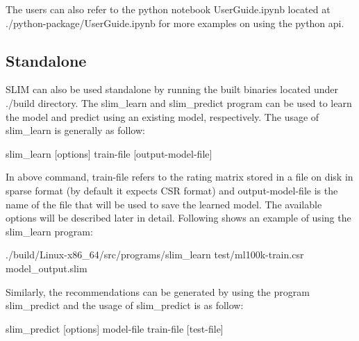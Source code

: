 The users can also refer to the python notebook {\ttfamily User\+Guide.\+ipynb} located at {\ttfamily ./python-\/package/\+User\+Guide.ipynb} for more examples on using the python api.\hypertarget{index_standalone_getting_Started}{}\subsection{Standalone}\label{index_standalone_getting_Started}
S\+L\+IM can also be used standalone by running the built binaries located under {\ttfamily ./build} directory. The {\ttfamily slim\+\_\+learn} and {\ttfamily slim\+\_\+predict} program can be used to learn the model and predict using an existing model, respectively. The usage of {\ttfamily slim\+\_\+learn} is generally as follow\+:

\begin{DoxyVerb}slim_learn [options] train-file [output-model-file] 
\end{DoxyVerb}


In above command, {\ttfamily train-\/file} refers to the rating matrix stored in a file on disk in sparse format (by default it expects C\+SR format) and {\ttfamily output-\/model-\/file} is the name of the file that will be used to save the learned model. The available options will be described later in detail. Following shows an example of using the {\ttfamily slim\+\_\+learn} program\+:

\begin{DoxyVerb}./build/Linux-x86_64/src/programs/slim_learn test/ml100k-train.csr model_output.slim
\end{DoxyVerb}


Similarly, the recommendations can be generated by using the program {\ttfamily slim\+\_\+predict} and the usage of {\ttfamily slim\+\_\+predict} is as follow\+:

\begin{DoxyVerb}slim_predict [options] model-file train-file [test-file]
\end{DoxyVerb}


